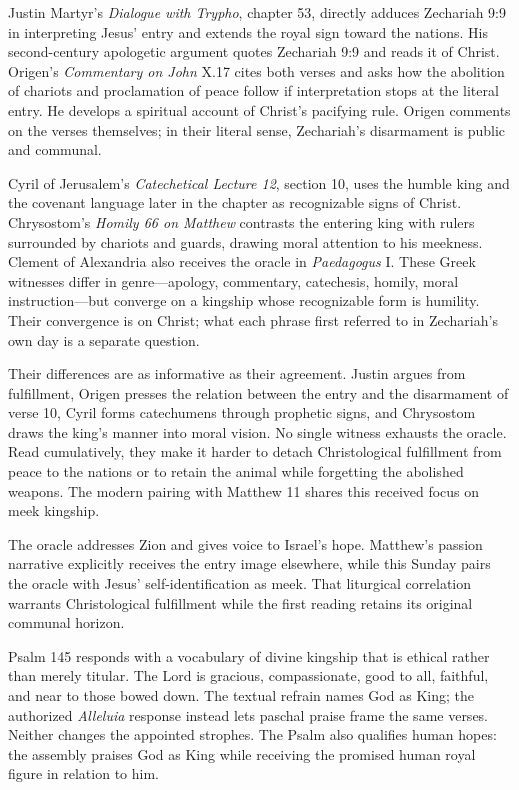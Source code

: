 Justin Martyr's \emph{Dialogue with Trypho}, chapter 53, directly adduces Zechariah 9:9 in interpreting Jesus' entry and extends the royal sign toward the nations. His second-century apologetic argument quotes Zechariah 9:9 and reads it of Christ. Origen's \emph{Commentary on John} X.17 cites both verses and asks how the abolition of chariots and proclamation of peace follow if interpretation stops at the literal entry. He develops a spiritual account of Christ's pacifying rule. Origen comments on the verses themselves; in their literal sense, Zechariah's disarmament is public and communal.

Cyril of Jerusalem's \emph{Catechetical Lecture 12}, section 10, uses the humble king and the covenant language later in the chapter as recognizable signs of Christ. Chrysostom's \emph{Homily 66 on Matthew} contrasts the entering king with rulers surrounded by chariots and guards, drawing moral attention to his meekness. Clement of Alexandria also receives the oracle in \emph{Paedagogus} I. These Greek witnesses differ in genre---apology, commentary, catechesis, homily, moral instruction---but converge on a kingship whose recognizable form is humility. Their convergence is on Christ; what each phrase first referred to in Zechariah's own day is a separate question.

Their differences are as informative as their agreement. Justin argues from fulfillment, Origen presses the relation between the entry and the disarmament of verse 10, Cyril forms catechumens through prophetic signs, and Chrysostom draws the king's manner into moral vision. No single witness exhausts the oracle. Read cumulatively, they make it harder to detach Christological fulfillment from peace to the nations or to retain the animal while forgetting the abolished weapons. The modern pairing with Matthew 11 shares this received focus on meek kingship.

The oracle addresses Zion and gives voice to Israel's hope. Matthew's passion narrative explicitly receives the entry image elsewhere, while this Sunday pairs the oracle with Jesus' self-identification as meek. That liturgical correlation warrants Christological fulfillment while the first reading retains its original communal horizon.

Psalm 145 responds with a vocabulary of divine kingship that is ethical rather than merely titular. The Lord is gracious, compassionate, good to all, faithful, and near to those bowed down. The textual refrain names God as King; the authorized \emph{Alleluia} response instead lets paschal praise frame the same verses. Neither changes the appointed strophes. The Psalm also qualifies human hopes: the assembly praises God as King while receiving the promised human royal figure in relation to him.

